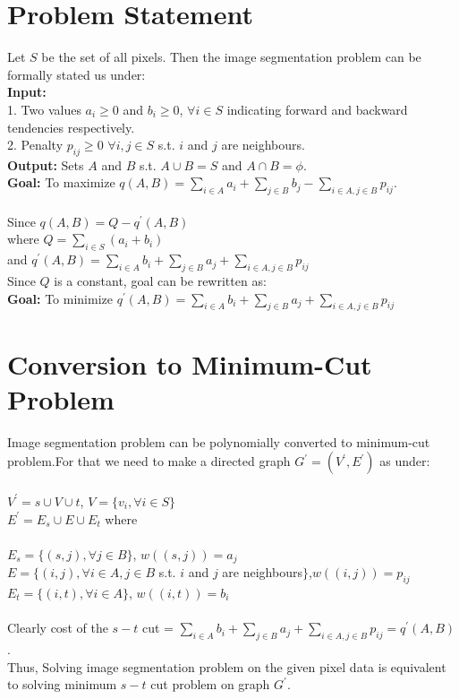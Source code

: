 \documentclass[twoside]{article}
\begin{document}
\section{Problem Statement}
Let $S$ be the set of all pixels. Then the image segmentation problem can be formally stated us under:\\
\textbf{Input:}\\
1. Two values $a_i \geq 0$ and $b_i \geq 0$, $\forall i \in S$ indicating forward and backward tendencies respectively.\\ 
2. Penalty $p_{ij} \geq 0$ $\forall i,j \in S$ s.t. $i$ and $j$ are neighbours.\\
\textbf{Output:} Sets $A$ and $B$ s.t. $A \cup B = S$ and $A\cap B = \phi$.\\
\textbf{Goal:} To maximize $q(A,B)= \sum \limits _{i\in A}a_i+\sum \limits_{j\in B}b_j- \sum \limits_{i \in A, j\in B}p_{ij}$.\\\\
Since $q(A,B)=Q - q^{'}(A,B)$\\
where $Q= \sum \limits_{i\in S}(a_i+b_i)$\\ and $ q^{'}(A,B)=\sum \limits_{i\in A}b_i + \sum \limits_{j\in B} a_j + \sum \limits_{i \in A, j\in B}p_{ij}$\\
Since $Q$ is a constant, goal can be rewritten as:\\
\textbf{Goal:} To minimize $ q^{'}(A,B)=\sum \limits_{i\in A}b_i + \sum \limits_{j\in B} a_j + \sum \limits_{i \in A, j\in B}p_{ij}$

\section{Conversion to Minimum-Cut Problem}
Image segmentation problem can be polynomially converted to minimum-cut problem.For that we need to make a directed graph $G^{'}=(V^{'},E^{'})$ as under:\\\\
$V^{'}=s \cup V \cup t $, $V=\lbrace v_i , \forall i \in S \rbrace$\\
$E^{'}= E_s \cup E \cup E_t $ where\\\\
$E_s=\lbrace (s,j) , \forall j \in B \rbrace$,\hspace*{158px} $w((s,j))= a_j$\\
$E=\lbrace (i,j), \forall i \in A , j\in B $ s.t. $ i $ and $ j $ are neighbours$ \rbrace$,\hspace*{20px}$w((i,j))= p_{ij}$\\
$E_t=\lbrace (i,t) , \forall i \in A \rbrace$,\hspace*{158px} $w((i,t))= b_i$\\\\
Clearly cost of the $s-t$ cut = $\sum \limits_{i\in A}b_i + \sum \limits_{j\in B} a_j + \sum \limits_{i \in A, j\in B}p_{ij} = q^{'}(A,B)$.\\Thus, Solving image segmentation problem on the given pixel data is equivalent to solving minimum $s-t$ cut problem on  graph $G^{'}$.
\end{document}
